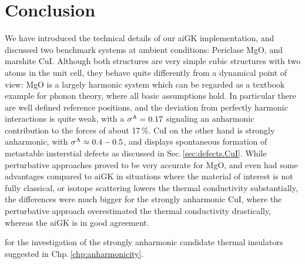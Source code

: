 \section{Conclusion}
We have introduced the technical details of our aiGK implementation, and discussed two benchmark systems at ambient conditions: Periclase MgO, and marshite CuI. Although both structures are very simple cubic structures with two atoms in the unit cell, they behave quite differently from a dynamical point of view: MgO is a largely harmonic system which can be regarded as a textbook example for phonon theory, where all basic assumptions hold. In particular there are well defined reference positions, and the deviation from perfectly harmonic interactions is quite weak, with a $\sigma^\mathrm{A} = 0.17$ signaling an anharmonic contribution to the forces of about 17\,\%. CuI on the other hand is strongly anharmonic, with $\sigma^\mathrm{A} \approx 0.4-0.5$, and displays spontaneous formation of metastable insterstial defects as discussed in Sec.\,\ref{sec:defects.CuI}. 
While perturbative approaches proved to be very accurate for MgO, and even had some advantages compared to aiGK in situations where the material of interest is not fully classical, or isotope scattering lowers the thermal conductivity substantially, the differences were much bigger for the strongly anharmonic CuI, where the perturbative approach overestimated the thermal conductivity drastically, whereas the aiGK is in good agreement.

 for the investigation of the strongly anharmonic candidate thermal insulators suggested in Chp.\,\ref{chp:anharmonicity}.

